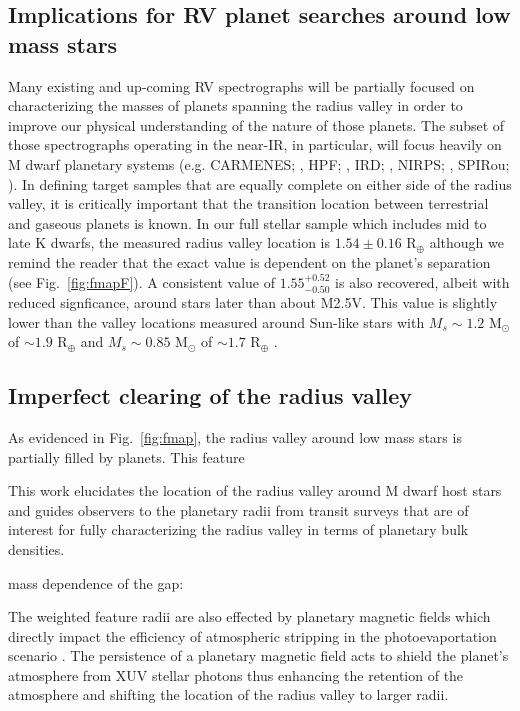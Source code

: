 \documentclass[twocolumn]{emulateapj}
\begin{document}
\subsection{Implications for RV planet searches around low mass stars}
Many existing and up-coming RV spectrographs
will be partially focused on characterizing the masses of planets spanning the radius valley in order to
improve our physical understanding of the nature of those planets. The subset of those spectrographs operating
in the near-IR, in particular, will focus heavily on M dwarf planetary systems
(e.g. CARMENES; \citealt{quirrenbach14}, HPF; \citealt{mahadevan12}, IRD; \citealt{kotani14},
NIRPS; \citealt{bouchy17}, SPIRou; \citealt{donati18}). In defining target samples
that are equally complete on either side of the radius valley, it is critically important that the transition
location between terrestrial and gaseous planets is known. In our full stellar sample which includes mid to
late K dwarfs, the measured radius valley location is $1.54\pm 0.16$ R$_{\oplus}$ although we remind the reader
that the exact value is dependent on the planet's separation (see Fig.~\ref{fig:fmapF}). A consistent value of
$1.55^{+0.52}_{-0.50}$ is also recovered, albeit with reduced signficance, around stars later than about M2.5V.
This value is slightly lower than the valley locations measured around Sun-like stars with $M_s \sim 1.2$
M$_{\odot}$ of $\sim 1.9$ R$_{\oplus}$ and  $M_s \sim 0.85$ M$_{\odot}$ of $\sim 1.7$ R$_{\oplus}$ \citep{fulton18}.

\subsection{Imperfect clearing of the radius valley}
As evidenced in Fig.~\ref{fig:fmap}, the radius valley around low mass stars is partially filled by planets.
This feature 

This work elucidates the location of
the radius valley around M dwarf host stars and guides observers to the planetary radii from transit surveys
that are of interest for fully characterizing the radius valley in terms of planetary bulk densities.

mass dependence of the gap: 

The weighted feature radii are also effected by planetary magnetic fields which directly impact the 
efficiency of atmospheric stripping in the photoevaportation scenario \citep{owen19}. The persistence 
of a planetary magnetic field acts to shield the planet's atmosphere from XUV stellar photons thus 
enhancing the retention of the atmosphere and shifting the location of the radius valley to larger 
radii.
\end{document}
